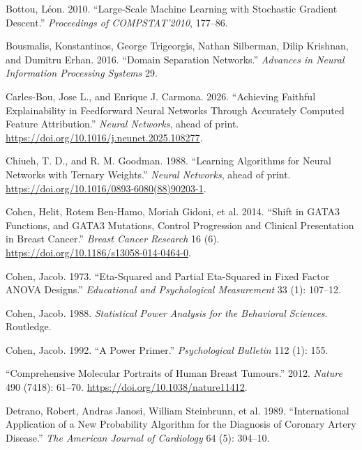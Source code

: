 \documentclass[
  letterpaper,
]{report}
\newlength{\cslhangindent}
\newenvironment{CSLReferences}[2] %
 {\begin{list}{}{%
  \setlength{\itemindent}{0pt}
  \setlength{\leftmargin}{0pt}
  \setlength{\parsep}{0pt}
  \ifodd #1
   \setlength{\leftmargin}{\cslhangindent}
   \setlength{\itemindent}{-1\cslhangindent}
  \fi
  \setlength{\itemsep}{#2\baselineskip}}}
 {\end{list}}
\begin{document}
\begin{CSLReferences}{1}{1}
Bottou, Léon. 2010. {``Large-Scale Machine Learning with Stochastic
Gradient Descent.''} \emph{Proceedings of COMPSTAT'2010}, 177--86.

Bousmalis, Konstantinos, George Trigeorgis, Nathan Silberman, Dilip
Krishnan, and Dumitru Erhan. 2016. {``Domain Separation Networks.''}
\emph{Advances in Neural Information Processing Systems} 29.

Carles-Bou, Jose L., and Enrique J. Carmona. 2026. {``Achieving Faithful
Explainability in Feedforward Neural Networks Through Accurately
Computed Feature Attribution.''} \emph{Neural Networks}, ahead of print.
\url{https://doi.org/10.1016/j.neunet.2025.108277}.

Chiueh, T. D., and R. M. Goodman. 1988. {``Learning Algorithms for
Neural Networks with Ternary Weights.''} \emph{Neural Networks}, ahead
of print. \url{https://doi.org/10.1016/0893-6080(88)90203-1}.

Cohen, Helit, Rotem Ben-Hamo, Moriah Gidoni, et al. 2014. {``Shift in
GATA3 Functions, and GATA3 Mutations, Control Progression and Clinical
Presentation in Breast Cancer.''} \emph{Breast Cancer Research} 16 (6).
\url{https://doi.org/10.1186/s13058-014-0464-0}.

Cohen, Jacob. 1973. {``Eta-Squared and Partial Eta-Squared in Fixed
Factor ANOVA Designs.''} \emph{Educational and Psychological
Measurement} 33 (1): 107--12.

Cohen, Jacob. 1988. \emph{Statistical Power Analysis for the Behavioral
Sciences}. Routledge.

Cohen, Jacob. 1992. {``A Power Primer.''} \emph{Psychological Bulletin}
112 (1): 155.

{``Comprehensive Molecular Portraits of Human Breast Tumours.''} 2012.
\emph{Nature} 490 (7418): 61--70.
\url{https://doi.org/10.1038/nature11412}.

Detrano, Robert, Andras Janosi, William Steinbrunn, et al. 1989.
{``International Application of a New Probability Algorithm for the
Diagnosis of Coronary Artery Disease.''} \emph{The American Journal of
Cardiology} 64 (5): 304--10.


\end{CSLReferences}
\end{document}

